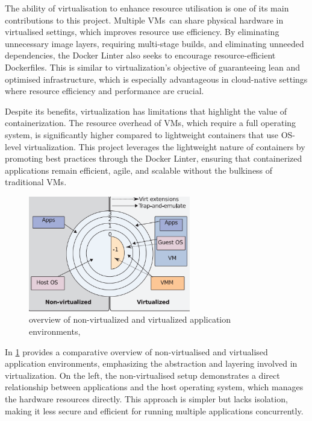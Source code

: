     The ability of virtualisation to enhance resource utilisation is one of its main contributions to this project. Multiple VMs can share physical hardware in virtualised settings, which improves resource use efficiency. By eliminating unnecessary image layers, requiring multi-stage builds, and eliminating unneeded dependencies, the Docker Linter also seeks to encourage resource-efficient Dockerfiles. This is similar to virtualization's objective of guaranteeing lean and optimised infrastructure, which is especially advantageous in cloud-native settings where resource efficiency and performance are crucial.\cite{2012virtualization}

    Despite its benefits, virtualization has limitations that highlight the value of containerization. The resource overhead of VMs, which require a full operating system, is significantly higher compared to lightweight containers that use OS-level virtualization. This project leverages the lightweight nature of containers by promoting best practices through the Docker Linter, ensuring that containerized applications remain efficient, agile, and scalable without the bulkiness of traditional VMs.\begin{figure}[ht]
  \centering
  \includegraphics[width=0.63\textwidth]{Figures/Virt.png}
  \caption{overview of non-virtualized and virtualized application environments, \cite{2012virtualization}} %
  \label{fig:2.2} %
\end{figure}

In \ref{fig:2.2} provides a comparative overview of non-virtualised and virtualised application environments, emphasizing the abstraction and layering involved in virtualization. On the left, the non-virtualised setup demonstrates a direct relationship between applications and the host operating system, which manages the hardware resources directly. This approach is simpler but lacks isolation, making it less secure and efficient for running multiple applications concurrently.

